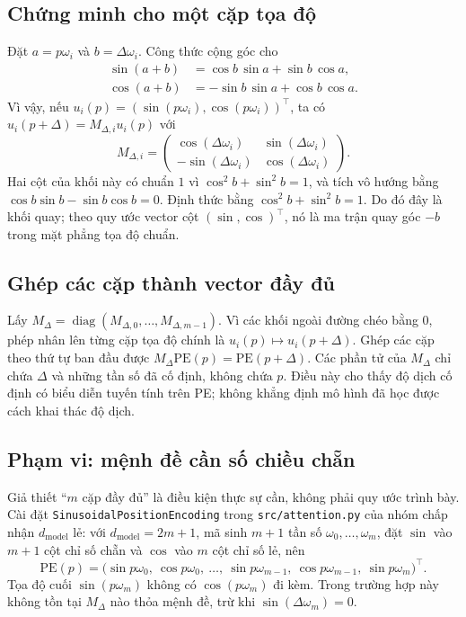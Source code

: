 \documentclass[11pt,a4paper]{article}
\DeclareMathOperator{\diag}{diag}
\newcommand{\PE}{\mathrm{PE}}
\begin{document}
\subsection*{Chứng minh cho một cặp tọa độ}
Đặt $a=p\omega_i$ và $b=\Delta\omega_i$. Công thức cộng góc cho
\begin{align*}
  \sin(a+b)&=\cos b\,\sin a+\sin b\,\cos a,\\
  \cos(a+b)&=-\sin b\,\sin a+\cos b\,\cos a.
\end{align*}
Vì vậy, nếu $u_i(p)=(\sin(p\omega_i),\cos(p\omega_i))^\top$, ta có $u_i(p+\Delta)=M_{\Delta,i}u_i(p)$ với
\[
  M_{\Delta,i}=
    \begin{pmatrix}
      \cos(\Delta\omega_i)&\sin(\Delta\omega_i)\\
      -\sin(\Delta\omega_i)&\cos(\Delta\omega_i)
    \end{pmatrix}.
\]
Hai cột của khối này có chuẩn $1$ vì $\cos^2 b+\sin^2 b=1$, và tích vô hướng bằng $\cos b\sin b-\sin b\cos b=0$. Định thức bằng $\cos^2 b+\sin^2 b=1$. Do đó đây là khối quay; theo quy ước vector cột $(\sin,\cos)^\top$, nó là ma trận quay góc $-b$ trong mặt phẳng tọa độ chuẩn.

\subsection*{Ghép các cặp thành vector đầy đủ}
Lấy $M_\Delta=\diag(M_{\Delta,0},\ldots,M_{\Delta,m-1})$. Vì các khối ngoài đường chéo bằng $0$, phép nhân lên từng cặp tọa độ chính là $u_i(p)\mapsto u_i(p+\Delta)$. Ghép các cặp theo thứ tự ban đầu được $M_\Delta\PE(p)=\PE(p+\Delta)$. Các phần tử của $M_\Delta$ chỉ chứa $\Delta$ và những tần số đã cố định, không chứa $p$. Điều này cho thấy độ dịch cố định có biểu diễn tuyến tính trên PE; không khẳng định mô hình đã học được cách khai thác độ dịch.

\subsection*{Phạm vi: mệnh đề cần số chiều chẵn}
Giả thiết ``$m$ cặp đầy đủ'' là điều kiện thực sự cần, không phải quy ước trình bày. Cài đặt \texttt{SinusoidalPositionEncoding} trong \texttt{src/attention.py} của nhóm chấp nhận $d_{\mathrm{model}}$ lẻ: với $d_{\mathrm{model}}=2m+1$, mã sinh $m+1$ tần số $\omega_0,\ldots,\omega_m$, đặt $\sin$ vào $m+1$ cột chỉ số chẵn và $\cos$ vào $m$ cột chỉ số lẻ, nên
\[
  \PE(p)=\bigl(\sin p\omega_0,\ \cos p\omega_0,\ \ldots,\
                \sin p\omega_{m-1},\ \cos p\omega_{m-1},\
                \sin p\omega_m\bigr)^\top .
\]
Tọa độ cuối $\sin(p\omega_m)$ không có $\cos(p\omega_m)$ đi kèm. Trong trường hợp này không tồn tại $M_\Delta$ nào thỏa mệnh đề, trừ khi $\sin(\Delta\omega_m)=0$.
\end{document}
